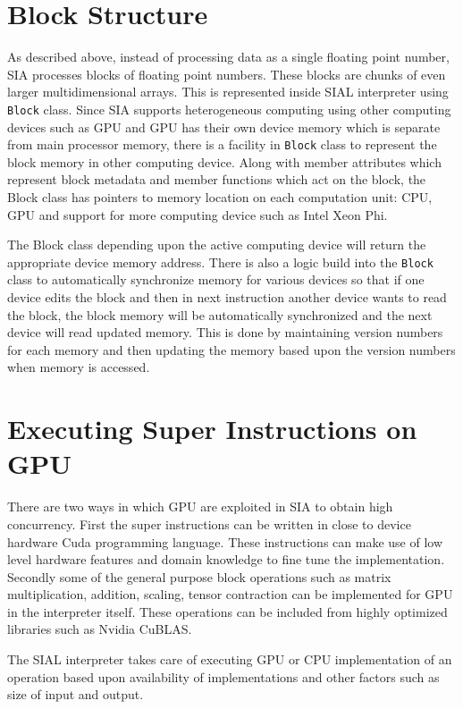 \section{Block Structure}
As described above, instead of processing data as a single floating point
number, SIA processes blocks of floating point numbers. These blocks are chunks
of even larger multidimensional arrays. This is represented inside SIAL
interpreter using \texttt{Block} class. Since SIA supports heterogeneous computing
using other computing devices such as GPU and GPU has their own device memory
which is separate from main processor memory, there is a facility in
\texttt{Block} class to represent the block memory in other
computing device. Along with member attributes which represent block metadata
and member functions which act on the block, the Block class has pointers to
memory location on each computation unit: CPU, GPU and support for more
computing device such as Intel Xeon Phi.

The Block class depending upon the active computing device will return the
appropriate device memory address. There is also a logic build into the \texttt{Block}
class to automatically synchronize memory for various devices so that if one
device edits the block and then in next instruction another device wants
to read the block, the block memory will be automatically synchronized and the
next device will read updated memory. This is done by maintaining version numbers
for each memory and then updating the memory based upon the version numbers when
memory is accessed.

\section{Executing Super Instructions on GPU}
There are two ways in which GPU are exploited in SIA to obtain high concurrency.
First the super instructions can be written in close to device hardware Cuda
programming language. These instructions can make use of low level hardware
features and domain knowledge to fine tune the implementation. Secondly some of
the general purpose block operations such as matrix multiplication, addition,
scaling, tensor contraction can be implemented for GPU in the interpreter
itself. These operations can be included from highly optimized libraries such as
Nvidia CuBLAS.

The SIAL interpreter takes care of executing GPU or CPU implementation of an
operation based upon availability of implementations and other factors such as
size of input and output.

